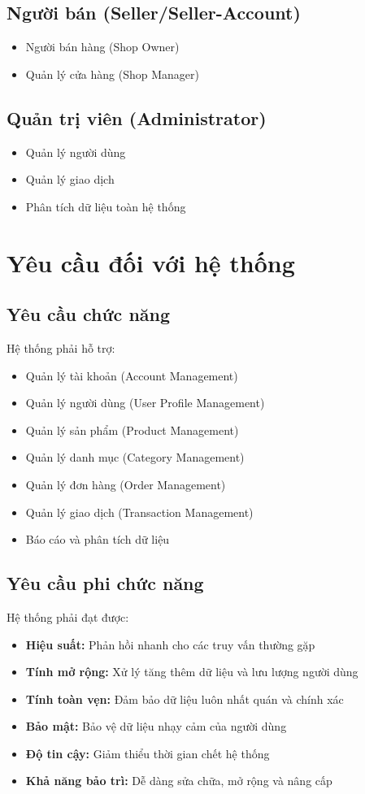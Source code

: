 \subsection{Người bán (Seller/Seller-Account)}
\begin{itemize}
    \item Người bán hàng (Shop Owner)
    \item Quản lý cửa hàng (Shop Manager)
\end{itemize}

\subsection{Quản trị viên (Administrator)}
\begin{itemize}
    \item Quản lý người dùng
    \item Quản lý giao dịch
    \item Phân tích dữ liệu toàn hệ thống
\end{itemize}

\section{Yêu cầu đối với hệ thống}

\subsection{Yêu cầu chức năng}

Hệ thống phải hỗ trợ:
\begin{itemize}
    \item Quản lý tài khoản (Account Management)
    \item Quản lý người dùng (User Profile Management)
    \item Quản lý sản phẩm (Product Management)
    \item Quản lý danh mục (Category Management)
    \item Quản lý đơn hàng (Order Management)
    \item Quản lý giao dịch (Transaction Management)
    \item Báo cáo và phân tích dữ liệu
\end{itemize}

\subsection{Yêu cầu phi chức năng}

Hệ thống phải đạt được:
\begin{itemize}
    \item \textbf{Hiệu suất:} Phản hồi nhanh cho các truy vấn thường gặp
    \item \textbf{Tính mở rộng:} Xử lý tăng thêm dữ liệu và lưu lượng người dùng
    \item \textbf{Tính toàn vẹn:} Đảm bảo dữ liệu luôn nhất quán và chính xác
    \item \textbf{Bảo mật:} Bảo vệ dữ liệu nhạy cảm của người dùng
    \item \textbf{Độ tin cậy:} Giảm thiểu thời gian chết hệ thống
    \item \textbf{Khả năng bảo trì:} Dễ dàng sửa chữa, mở rộng và nâng cấp
\end{itemize}